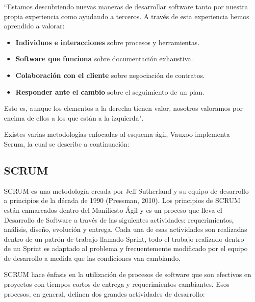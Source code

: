 \documentclass[a4paper, 12pt]{article}
\begin{document}
``Estamos descubriendo nuevas maneras de desarrollar software tanto por nuestra propia experiencia como ayudando a terceros. A través de esta experiencia hemos aprendido a valorar:

\begin{itemize}
\item \textbf{Individuos e interacciones} sobre procesos y herramientas.
\item \textbf{Software que funciona} sobre documentación exhaustiva.
\item \textbf{Colaboración con el cliente} sobre negociación de contratos.
\item \textbf{Responder ante el cambio} sobre el seguimiento de un plan.
\end{itemize}

Esto es, aunque los elementos a la derecha tienen valor, nosotros valoramos por encima de ellos a los que están a la izquierda".

Existes varias metodologías enfocadas al esquema ágil, Vauxoo implementa Scrum, la cual se describe a continuación:

\subsection{SCRUM}

SCRUM es una metodología creada por Jeff Sutherland y su equipo de desarrollo a principios de la década de 1990 (Pressman, 2010). Los principios de SCRUM están enmarcados dentro del Manifiesto Ágil y es un proceso que lleva el Desarrollo de Software a través de las siguientes actividades: requerimientos, análisis, diseño, evolución y entrega. Cada una de esas actividades son realizadas dentro de un patrón de trabajo llamado Sprint, todo el trabajo realizado dentro de un Sprint es adaptado al problema y frecuentemente modificado por el equipo de desarrollo a medida que las condiciones van cambiando.

SCRUM hace énfasis en la utilización de procesos de software que son efectivos en proyectos con tiempos cortos de entrega y requerimientos cambiantes. Esos procesos, en general, definen dos grandes actividades de desarrollo:
\end{document}
